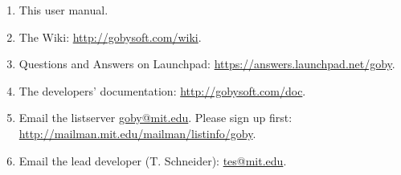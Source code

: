 \begin{enumerate}
\item This user manual. %
\item The Wiki: \url{http://gobysoft.com/wiki}.
\item Questions and Answers on Launchpad: \url{https://answers.launchpad.net/goby}.
\item The developers' documentation: \url{http://gobysoft.com/doc}.
\item Email the listserver \href{mailto:goby@mit.edu}{goby@mit.edu}. Please sign up first: \url{http://mailman.mit.edu/mailman/listinfo/goby}.
\item Email the lead developer (T. Schneider): \href{mailto:tes@mit.edu}{tes@mit.edu}.
\end{enumerate}

